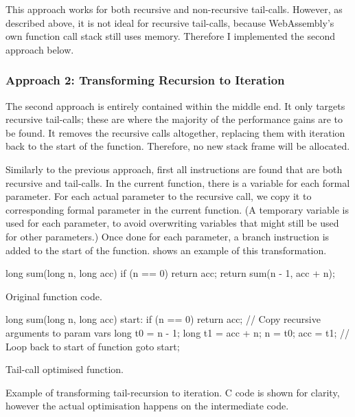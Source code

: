 \documentclass[00-main.tex]{subfiles}
\begin{document}
This approach works for both recursive and non-recursive tail-calls.
However, as described above, it is not ideal for recursive tail-calls, because WebAssembly's own function call stack still uses  memory.
Therefore I implemented the second approach below.

\subsubsection{Approach 2: Transforming Recursion to Iteration}

The second approach is entirely contained within the middle end.
It only targets recursive tail-calls; these are where the majority of the performance gains are to be found.
It removes the recursive calls altogether, replacing them with iteration back to the start of the function.
Therefore, no new stack frame will be allocated.

Similarly to the previous approach, first all  instructions are found that are both recursive and tail-calls.
In the current function, there is a variable for each formal parameter.
For each actual parameter to the recursive call, we copy it to corresponding formal parameter in the current function.
(A temporary variable is used for each parameter, to avoid overwriting variables that might still be used for other parameters.)
Once done for each parameter, a branch instruction is added to the start of the function.
 shows an example of this transformation.

\begin{listing}[!b]
  \begin{sublisting}[b]{0.49\textwidth}
    \begin{CListing}
      long sum(long n, long acc) {
          if (n == 0) {
              return acc;
          }
          return sum(n - 1, acc + n);
      }
    \end{CListing}
    \caption{Original function code.}
  \end{sublisting}
  \hfill
  \begin{sublisting}[b]{0.49\textwidth}
    \begin{CListing}
      long sum(long n, long acc) {
      start:
          if (n == 0) return acc;
          // Copy recursive arguments to param vars
          long t0 = n - 1;
          long t1 = acc + n;
          n = t0;
          acc = t1;
          // Loop back to start of function
          goto start;
      }
    \end{CListing}
    \caption{Tail-call optimised function.}
  \end{sublisting}
  \caption{Example of transforming tail-recursion to iteration. C code is shown for clarity, however the actual optimisation happens on the intermediate code.}
  \label{lst:tail-call optimisation example}
\end{listing}
\end{document}
